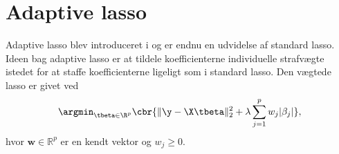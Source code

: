 %
%
\section{Adaptive lasso}
Adaptive lasso blev introduceret i \citep{adaptive_lasso} og er endnu en udvidelse af standard lasso.
Ideen bag adaptive lasso er at tildele koefficienterne individuelle strafvægte istedet for at staffe koefficienterne ligeligt som i standard lasso.
Den vægtede lasso er givet ved
\begin{align*}
\argmin_{\tbeta \in \R^p} \cbr{\Vert \y - \X \tbeta \Vert_2^2 + \lambda \sum_{j=1}^p w_j \vert \beta_j \vert},
\end{align*}
hvor \(\mathbf{w} \in \mathbb{R}^p\) er en kendt vektor og \(w_j \geq 0\).

